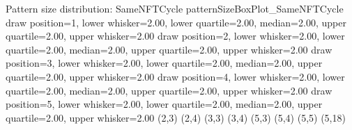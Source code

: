 \sizeBoxPlot
{Pattern size distribution: SameNFTCycle}
{patternSizeBoxPlot_SameNFTCycle}
{draw position=1, lower whisker=2.00, lower quartile=2.00, median=2.00, upper quartile=2.00, upper whisker=2.00}
{draw position=2, lower whisker=2.00, lower quartile=2.00, median=2.00, upper quartile=2.00, upper whisker=2.00}
{draw position=3, lower whisker=2.00, lower quartile=2.00, median=2.00, upper quartile=2.00, upper whisker=2.00}
{draw position=4, lower whisker=2.00, lower quartile=2.00, median=2.00, upper quartile=2.00, upper whisker=2.00}
{draw position=5, lower whisker=2.00, lower quartile=2.00, median=2.00, upper quartile=2.00, upper whisker=2.00}
{(2,3) (2,4) (3,3) (3,4) (5,3) (5,4) (5,5) (5,18) }
